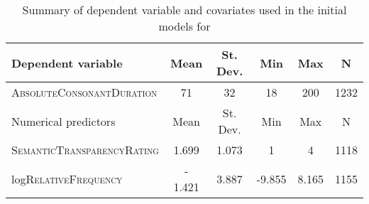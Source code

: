 \begin{table}\small
	\caption{Summary of dependent variable and covariates used in the initial models for }
	\label{tab: summary dep variables in-model Experiment in}
			\begin{tabularx}{\textwidth}{QSSSSS[table-format=4.0]}
				\lsptoprule
				{Dependent variable}  &       {Mean}  & {St. Dev.} &     {Min}      & {Max}& {N}\\\midrule
				\textsc{AbsoluteConsonantDuration}     & 71 & 32 & 18 &200 & 1232\\ 
				\midrule
                {Numerical predictors} &       {Mean}  & {St. Dev.} &     {Min}      & {Max}& {N}\\\midrule
				\textsc{SemanticTransparencyRating}  &1.699& 1.073 & 1 & 4 &1118 \\
				log\textsc{RelativeFrequency}          & - 1.421&  3.887 & -9.855 &8.165 &1155\\ 
				

\end{tabularx}
\end{table}
